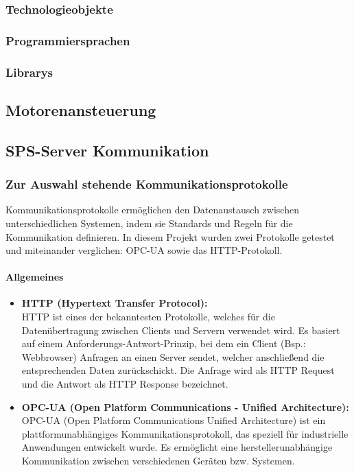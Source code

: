     \subsubsection{Technologieobjekte}

    \subsubsection{Programmiersprachen}

    \subsubsection{Librarys}
    \label{Libraryeinbindung}

\subsection{Motorenansteuerung}

\subsection{SPS-Server Kommunikation}

    \subsubsection{Zur Auswahl stehende Kommunikationsprotokolle} 
    \label{Kommunikationsprotokolle}

    Kommunikationsprotokolle ermöglichen den Datenaustausch zwischen unterschiedlichen Systemen, indem sie Standards und Regeln für die Kommunikation definieren. In diesem Projekt wurden zwei Protokolle getestet und miteinander verglichen: OPC-UA sowie das HTTP-Protokoll.


         \paragraph{Allgemeines}

        \begin{itemize}
            \item \textbf{HTTP (Hypertext Transfer Protocol):}  \mbox{} \\
            HTTP ist eines der bekanntesten Protokolle, welches für die Datenübertragung zwischen Clients und Servern verwendet wird. Es basiert auf einem Anforderungs-Antwort-Prinzip, bei dem ein Client (Bsp.: Webbrowser) Anfragen an einen Server sendet, welcher anschließend die entsprechenden Daten zurückschickt. Die Anfrage wird als HTTP Request und die Antwort als HTTP Response bezeichnet.\cite{HTTP-Allgemein}
            
            \item \textbf{OPC-UA (Open Platform Communications - Unified Architecture):} \mbox{} \\
            OPC-UA (Open Platform Communications Unified Architecture) ist ein plattformunabhängiges Kommunikationsprotokoll, das speziell für industrielle Anwendungen entwickelt wurde. Es ermöglicht eine herstellerunabhängige Kommunikation zwischen verschiedenen Geräten bzw. Systemen. \cite{OPC-UA}
        \end{itemize}

